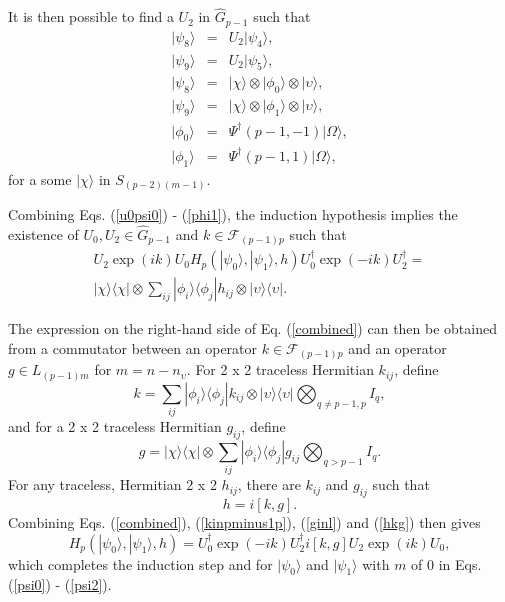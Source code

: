 \documentclass[12pt,amsmath,amssymb,onecolumn]{revtex4-2}
\begin{document}
It is then possible to find a $U_2$ in $\hat{G}_{p-1}$ such that
\begin{subequations}
\begin{eqnarray}
\label{u2psi4}
|\psi_8 \rangle  & = & U_2 |\psi_4 \rangle , \\
\label{u2psi5}
|\psi_9 \rangle  & = & U_2 |\psi_5 \rangle , \\
\label{psi6}
|\psi_8 \rangle  & = & | \chi \rangle  \otimes |\phi_0 \rangle  \otimes |\upsilon \rangle , \\
\label{psi7}
|\psi_9 \rangle  & = & | \chi \rangle  \otimes |\phi_1 \rangle  \otimes |\upsilon \rangle , \\
\label{phi0}
|\phi_0 \rangle  & = & \Psi^{\dagger}( p-1, -1) |\Omega \rangle , \\
\label{phi1}
|\phi_1 \rangle  & = & \Psi^{\dagger}( p-1, 1) |\Omega \rangle ,
\end{eqnarray}
\end{subequations}
for a some $|\chi \rangle $ in $S_{(p-2) (m-1)}$.



Combining Eqs. (\ref{u0psi0}) - (\ref{phi1}), the induction hypothesis
implies the existence of $U_0, U_2 \in \hat{G}_{p-1}$
and $k \in \mathcal{F}_{(p-1) p}$ such that
\begin{multline}
\label{combined}
U_2 \exp( i k) U_0 H_p( |\psi_0 \rangle , |\psi_1 \rangle , h) U_0^\dagger \exp( -i k) U_2^\dagger = \\
|\chi \rangle  \langle  \chi| \otimes \sum_{ij} |\phi_i \rangle  \langle \phi_j| h_{ij} \otimes |\upsilon \rangle  \langle \upsilon|.
\end{multline}

The expression on the right-hand side of Eq. (\ref{combined}) can then be obtained from a
commutator between an operator $k \in \mathcal{F}_{(p-1) p}$ and
an operator $g \in L_{(p-1) m}$ for $m = n - n_{\upsilon}$.
For 2 x 2 traceless Hermitian $k_{ij}$, define
\begin{equation}
\label{kinpminus1p}
k = \sum_{ij} |\phi_i \rangle  \langle \phi_j| k_{ij} \otimes |\upsilon \rangle  \langle \upsilon| \bigotimes_{q \ne p-1, p} I_q,
\end{equation}
and for a 2 x 2 traceless Hermitian $g_{ij}$, define
\begin{equation}
\label{ginl}
g  =  |\chi \rangle  \langle \chi| \otimes \sum_{ij} |\phi_i \rangle  \langle \phi_j| g_{ij} \bigotimes_{q > p-1} I_q.
\end{equation}
For any traceless, Hermitian 2 x 2 $h_{ij}$, there are $k_{ij}$ and $g_{ij}$ 
such that
\begin{equation}
\label{hkg}
h = i [ k, g].
\end{equation}
Combining Eqs. (\ref{combined}), (\ref{kinpminus1p}), (\ref{ginl}) and (\ref{hkg}) then gives
\begin{equation}
\label{endresult}
H_p( |\psi_0 \rangle , |\psi_1 \rangle , h) = 
U_0^\dagger \exp(-ik) U_2^\dagger i[k, g] U_2 \exp(ik) U_0,
\end{equation}
which completes the induction step and for $|\psi_0 \rangle $ and $|\psi_1 \rangle $ with $m$ of 0
in Eqs. (\ref{psi0}) - (\ref{psi2}).
\end{document}
